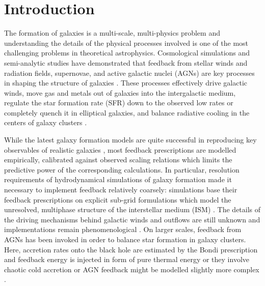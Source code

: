 \documentclass[useAMS,usenatbib]{mnras}
\begin{document}
\section{Introduction} \label{sec:intro}


The formation of galaxies is a multi-scale, multi-physics problem and understanding the details of the physical processes involved is one of the most challenging problems in theoretical astrophysics. Cosmological simulations and semi-analytic studies have demonstrated that feedback from stellar winds and radiation fields, supernovae, and active galactic nuclei (AGNs) are key processes in shaping the structure of galaxies \citep[e.g.][]{Brook2012,Stinson2013,Puchwein2013,Marinacci2014,Vogelsberger2014,Henriques2015,Schaye2015,Dubois2016,Kaviraj2017,Pillepich2018,Hopkins2018}. These processes effectively drive galactic winds, move gas and metals out of galaxies into the intergalactic medium, regulate the star formation rate (SFR) down to the observed low rates or completely quench it in elliptical galaxies, and balance radiative cooling in the centers of galaxy clusters \citep{Kravtsov2012,Battaglia2012,Battaglia2012b,Battaglia2013,McCarthy2014,McCarthy2017,Dolag2016,Weinberger2017}.

While the latest galaxy formation models are quite successful in reproducing key observables of realistic galaxies \citep[e.g.][]{Wang2015,Sawala2016,Grand2017,Hopkins2018,Buck2019b}, most feedback prescriptions are modelled empirically, calibrated against observed scaling relations which limits the predictive power of the corresponding calculations. In particular, resolution requirements of hydrodynamical simulations of galaxy formation made it necessary to implement feedback relatively coarsely: simulations base their feedback prescriptions on explicit sub-grid formulations which model the unresolved, multiphase structure of the interstellar medium (ISM) \citep{Springel2003,Schaye2008}.
The details of the driving mechanisms behind galactic winds and outflows are still unknown and implementations remain phenomenological \citep{Oppenheimer2006}. On larger scales, feedback from AGNs has been invoked in order to balance star formation in galaxy clusters. Here, accretion rates onto the black hole are estimated by the Bondi prescription and feedback energy is injected in form of pure thermal energy \citep{DiMatteo2005,Springel2005} or they involve chaotic cold accretion \citep{Gaspari2013} or AGN feedback might be modelled slightly more complex \citep{Weinberger2017,Dave2019}.
\end{document}
